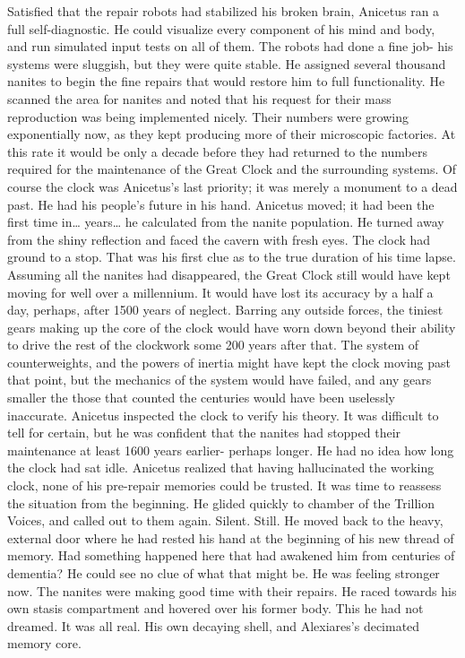 \documentclass[a4paper]{article}
\begin{document}
Satisfied that the repair robots had stabilized his broken brain, Anicetus ran a full self-diagnostic. He could visualize every component of his mind and body, and run simulated input tests on all of them. The robots had done a fine job- his systems were sluggish, but they were quite stable. He assigned several thousand nanites to begin the fine repairs that would restore him to full functionality.
He scanned the area for nanites and noted that his request for their mass reproduction was being implemented nicely. Their numbers were growing exponentially now, as they kept producing more of their microscopic factories. At this rate it would be only a decade before they had returned to the numbers required for the maintenance of the Great Clock and the surrounding systems. Of course the clock was Anicetus’s last priority; it was merely a monument to a dead past. He had his people’s future in his hand.
Anicetus moved; it had been the first time in… years… he calculated from the nanite population. He turned away from the shiny reflection and faced the cavern with fresh eyes.
The clock had ground to a stop. That was his first clue as to the true duration of his time lapse. Assuming all the nanites had disappeared, the Great Clock still would have kept moving for well over a millennium. It would have lost its accuracy by a half a day, perhaps, after 1500 years of neglect. Barring any outside forces, the tiniest gears making up the core of the clock would have worn down beyond their ability to drive the rest of the clockwork some 200 years after that. The system of counterweights, and the powers of inertia might have kept the clock moving past that point, but the mechanics of the system would have failed, and any gears smaller the those that counted the centuries would have been uselessly inaccurate.
Anicetus inspected the clock to verify his theory. It was difficult to tell for certain, but he was confident that the nanites had stopped their maintenance at least 1600 years earlier- perhaps longer. He had no idea how long the clock had sat idle.
Anicetus realized that having hallucinated the working clock, none of his pre-repair memories could be trusted. It was time to reassess the situation from the beginning.
He glided quickly to chamber of the Trillion Voices, and called out to them again.
Silent. Still.
He moved back to the heavy, external door where he had rested his hand at the beginning of his new thread of memory. Had something happened here that had awakened him from centuries of dementia? He could see no clue of what that might be.
He was feeling stronger now. The nanites were making good time with their repairs. He raced towards his own stasis compartment and hovered over his former body. This he had not dreamed. It was all real. His own decaying shell, and Alexiares’s decimated memory core.
\end{document}
